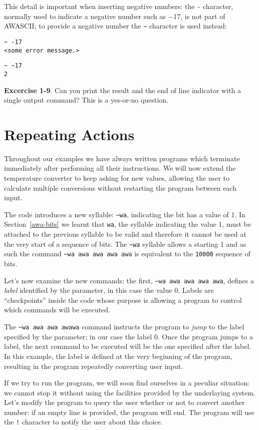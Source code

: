 \documentclass[11pt,a4paper,draft]{book}
\begin{document}
This detail is important when inserting negative numbers: the \verb|-|
character, normally used to indicate a negative number such as
\num{-17}, is not part of AWASCII; to provide a negative number
the \verb|~| character is used instead:
\begin{verbatim}
~ -17
<some error message.>
\end{verbatim}
\begin{verbatim}
~ ~17
2
\end{verbatim}

\textbf{Excercise 1-9}. Can you print the result and the end of line
indicator with a single output command? This is a yes-or-no question.

\section{Repeating Actions}
Throughout our examples we have always written programs which
terminate immediately after performing all their instructions. We will
now extend the temperature converter to keep asking for new values,
allowing the user to calculate multiple conversions without restarting
the program between each input.


The code introduces a new syllable: \verb|~wa|, indicating the bit
has a value of 1. In Section~\ref{awa-bits} we learnt that \verb|wa|,
the syllable indicating the value 1, must be attached to the previous
syllable to be valid and therefore it cannot be used at the very start
of a sequence of bits. The \verb|~wa| syllable allows a starting 1 and
as such the command \verb|~wa awa awa awa awa| is equivalent to the
\verb|10000| sequence of bits.

Let's now examine the new commands: the first,
\verb|~wa awa awa awa awa|, defines a \emph{label} identified by the
parameter, in this case the value 0. Labels are \enquote{checkpoints}
inside the code whose purpose is allowing a program to control which
commands will be executed.

The \verb|~wa awa awa awawa| command instructs the program to
\emph{jump} to the label specified by the parameter; in our case the
label 0. Once the program jumps to a label, the next command to be
executed will be the one specified after the label. In this example,
the label is defined at the very beginning of the program, resulting
in the program repeatedly converting user input.

If we try to run the program, we will soon find ourselves in a
peculiar situation: we cannot stop it without using the facilities
provided by the underlaying system. Let's modify the program to query
the user whether or not to convert another number: if an empty line is
provided, the program will end. The program will use the \verb|!|
character to notify the user about this choice.

\end{document}
